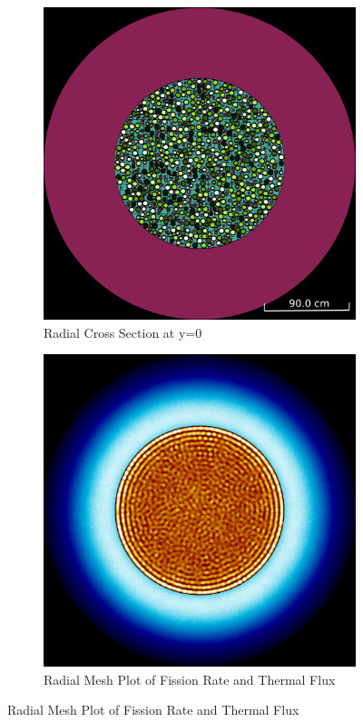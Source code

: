 \begin{figure}[H]
\centering

\begin{subfigure}{0.45\textwidth}
  \includegraphics[width=0.95\linewidth]{figures/control/control-r}
  \caption{Radial Cross Section at y=0}
  \label{fig:controla}
\end{subfigure}%
%
\begin{subfigure}{0.45\textwidth}
  \includegraphics[width=0.95\linewidth]{figures/control/control-rm}
  \caption{Radial Mesh Plot of Fission Rate and Thermal Flux}
  \label{fig:controlb}
\end{subfigure}


\end{figure}
